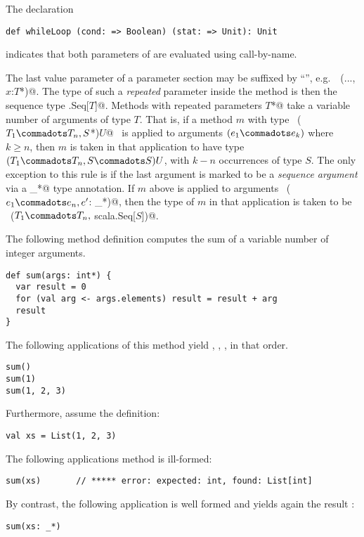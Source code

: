 \example The declaration
\begin{lstlisting}
def whileLoop (cond: => Boolean) (stat: => Unit): Unit
\end{lstlisting}
indicates that both parameters of  are evaluated using
call-by-name.

The last value parameter of a parameter section may be suffixed by
``\code{*}'', e.g.\ ~\lstinline@(..., $x$:$T$*)@.  The type of such a
{\em repeated} parameter inside the method is then the sequence type
\lstinline@scala.Seq[$T$]@.  Methods with repeated parameters
\lstinline@$T$*@ take a variable number of arguments of type $T$.
That is, if a method $m$ with type ~\lstinline@($T_1 \commadots T_n,
S$*)$U$@~ is applied to arguments $(e_1 \commadots e_k)$ where $k \geq
n$, then $m$ is taken in that application to have type $(T_1
\commadots T_n, S \commadots S)U$, with $k - n$ occurrences of type
$S$.  The only exception to this rule is if the last argument is
marked to be a {\em sequence argument} via a \lstinline@_*@ type
annotation. If $m$ above is applied to arguments
~\lstinline@($e_1 \commadots e_n, e'$: _*)@, then the type of $m$ in
that application is taken to be 
~\lstinline@($T_1\commadots T_n,$ scala.Seq[$S$])@.

\example The following method definition computes the sum of a variable number
of integer arguments.
\begin{lstlisting}
def sum(args: int*) {
  var result = 0 
  for (val arg <- args.elements) result = result + arg 
  result
}
\end{lstlisting}
The following applications of this method yield , ,
, in that order.
\begin{lstlisting}
sum()
sum(1)
sum(1, 2, 3)
\end{lstlisting}
Furthermore, assume the definition:
\begin{lstlisting}
val xs = List(1, 2, 3)
\end{lstlisting}
The following applications method \lstinline@sum@ is ill-formed:
\begin{lstlisting}
sum(xs)       // ***** error: expected: int, found: List[int]
\end{lstlisting}
By contrast, the following application is well formed and yields again
the result :
\begin{lstlisting}
sum(xs: _*) 
\end{lstlisting}


